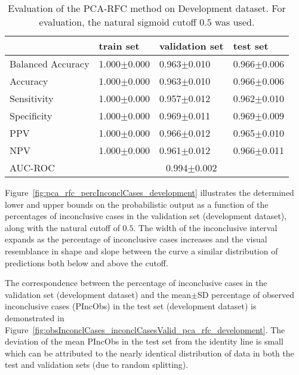 \begin{table}[ht]
  \caption{Evaluation of the PCA-RFC method on Development dataset. 
  For evaluation, the natural sigmoid cutoff $0.5$ was used.}
  \centering
  \begin{tabular}{llll}
      \hline
                        & train set         & validation set      & test set             \\
      \hline
      Balanced Accuracy & 1.000$\pm$0.000   &   0.963$\pm$0.010    &  0.966$\pm$0.006   \\
      Accuracy          & 1.000$\pm$0.000    &   0.963$\pm$0.010  &  0.966$\pm$0.006    \\
      Sensitivity       &  1.000$\pm$0.000   &   0.957$\pm$0.012   &  0.962$\pm$0.010   \\
      Specificity       & 1.000$\pm$0.000    &   0.969$\pm$0.011  &  0.969$\pm$0.009   \\
      PPV               &  1.000$\pm$0.000   &   0.966$\pm$0.012   &  0.965$\pm$0.010   \\
      NPV               &  1.000$\pm$0.000   &   0.961$\pm$0.012  &  0.966$\pm$0.011   \\
      \hline
      AUC-ROC          &  \multicolumn{3}{c}{0.994$\pm$0.002}  \\
      \hline
  \end{tabular}
 \label{t1:erc_perf_eval_table}
\end{table}

Figure~\ref{fig:pca_rfc_percInconclCases_development} illustrates the determined lower and upper bounds on the 
probabilistic output as a function of the percentages of inconclusive cases in the validation set (development dataset), 
along with the natural cutoff of $0.5$.
The width of the inconclusive interval expands as the percentage of inconclusive cases increases 
and the visual resemblance in shape and slope between the curve a similar distribution of predictions both below and above the cutoff.

The correspondence between the percentage of inconclusive cases in the validation set (development dataset) and 
the mean$\pm$SD percentage of observed inconclusive cases (PIncObs) in the test set (development dataset) 
is demonstrated in Figure~\ref{fig:obsInconclCases_inconclCasesValid_pca_rfc_development}.
The deviation of the mean PIncObs in the test set from the 
identity line is small which can be attributed to the nearly identical distribution of data in both the test and validation sets 
(due to random splitting).


